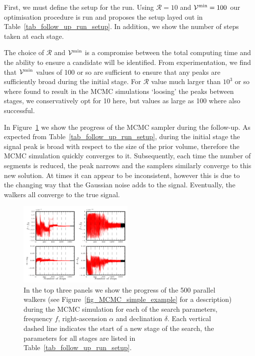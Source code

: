 \documentclass[aps, prd, twocolumn, superscriptaddress, floatfix, showpacs, nofootinbib, longbibliography]{revtex4-1}
\begin{document}
First, we must define the setup for the run. Using $\mathcal{R}=10$ and
$\V^{\rm min}=100$ our optimisation procedure is run and proposes the setup
layed out in Table~\ref{tab_follow_up_run_setup}. In addition, we show the
number of steps taken at each stage.
\begin{table}[htb]
\caption{The search setup used in Figure~\ref{fig_follow_up}, generated with
$\mathcal{R}=10$ and $\V^{\rm min}=100$.}
\label{tab_follow_up_run_setup}

\end{table}

The choice of $\mathcal{R}$ and $\mathcal{V}^{\rm min}$ is a compromise between the
total computing time and the ability to ensure a candidate will be identified.
From experimentation, we find that $\mathcal{V}^{\rm min}$ values of 100 or so are
sufficient to ensure that any peaks are sufficiently broad during the
initial stage. For $\mathcal{R}$ value much larger than $10^{3}$ or so where
found to result in the MCMC simulations `loosing' the peaks between stages, we
conservatively opt for 10 here, but values as large as 100 where also successful.

In Figure~\ref{fig_follow_up} we show the progress of the MCMC sampler during
the follow-up.  As expected from Table~\ref{tab_follow_up_run_setup}, during
the initial stage the signal peak is broad with respect to the size of the
prior volume, therefore the MCMC simulation quickly converges to it. Subsequently,
each time the number of segments is reduced, the peak narrows and the samplers
similarly converge to this new solution. At times it can appear to be inconsistent,
however this is due to the changing way that the Gaussian noise adds to the signal.
Eventually, the walkers all converge to the true signal.
\begin{figure}[htb]
\centering
\includegraphics[width=0.5\textwidth]{follow_up_walkers}
\caption{In the top three panels we show the progress of the 500 parallel
walkers (see Figure~\ref{fig_MCMC_simple_example} for a description) during the
MCMC simulation for each of the search parameters, frequency $f$,
right-ascension $\alpha$ and declination $\delta$. Each vertical dashed line indicates the start of a new stage of the search, the parameters for all stages
are listed in Table~\ref{tab_follow_up_run_setup}.}
\label{fig_follow_up}
\end{figure}
\end{document}
